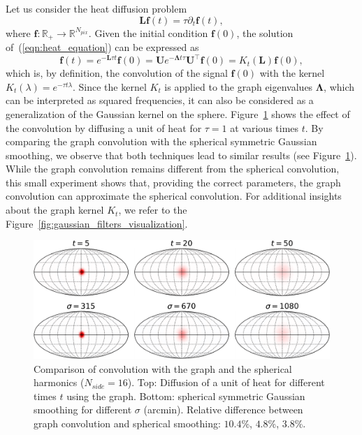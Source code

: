\documentclass[final,twocolumn,3p,times,sort&compress]{elsarticle}
\newcommand{\figref}[1]{Figure~\ref{fig:#1}}
\newcommand{\eqnref}[1]{(\ref{eqn:#1})}
\renewcommand{\b}[1]{{\bm{#1}}}   %
\newcommand{\1}{\b{1}}              %
\newcommand{\0}{\b{0}}              %
\newcommand{\g}[1]{\b{#1}}
\renewcommand{\L}{\b{L}}
\newcommand{\U}{\b{U}}
\newcommand{\trans}{^\intercal}
\newcommand{\R}{\mathbb{R}}
\newcommand{\bLambda}{\b{\Lambda}}
\begin{document}
Let us consider the heat diffusion problem
\begin{equation}
  \L \b{f}(t) = \tau \partial_t \b{f}(t),
  \label{eqn:heat_equation}
\end{equation}
where $\b{f}: \R_+ \rightarrow \R^{N_{pix}}$. Given the initial condition
$\b{f}(0)$, the solution of~\eqnref{heat_equation} can be expressed as
\begin{equation*}
  \b{f}(t) = e^{-\L \tau t} \b{f}(0) = \U e^{-\bLambda t \tau} \U\trans \g{f}(0) = K_t(\L) \b{f}(0),
\end{equation*}
which is, by definition, the convolution of the signal $\b{f}(0)$ with the kernel $K_t(\lambda)=e^{-\tau t \lambda}$. Since the kernel $K_t$ is applied to the graph eigenvalues $\bLambda$, which can be interpreted as squared frequencies, it can also be considered as a generalization of the Gaussian kernel on the sphere. \figref{gaussian_filters_comparizon} shows the effect of the convolution by diffusing a unit of heat for $\tau=1$ at various times $t$. By comparing the graph convolution with the spherical symmetric Gaussian smoothing, we observe that both techniques lead to similar results (see \figref{gaussian_filters_comparizon}). While the graph convolution remains different from the spherical convolution, this small experiment shows that, providing the correct parameters, the graph convolution can approximate the spherical convolution. For additional insights about the graph kernel $K_t$, we refer to the \figref{gaussian_filters_visualization}.

\begin{figure}[ht!]
  \centering
  \includegraphics[width=\linewidth]{gaussian_filters_sphere}
  \caption{Comparison of convolution with the graph and the spherical harmonics ($N_{side} = 16$).
  Top: Diffusion of a unit of heat for different times $t$ using the graph.
  Bottom: spherical symmetric Gaussian smoothing for different $\sigma$ (arcmin).
  Relative difference between graph convolution and spherical smoothing: $10.4$\%, $4.8$\%, $3.8$\%.
}
  \label{fig:gaussian_filters_comparizon}
\end{figure}
\end{document}
